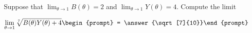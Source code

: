 \documentclass{ximera}
\author{Matthew Carr}
\begin{document}
\begin{exercise}
Suppose that $\lim_{\theta\to1}B(\theta)=2$ and $\lim_{\theta\to1}Y(\theta)=4$. Compute the limit

\[
\lim_{\theta\to 1 } \sqrt[7]{B(\theta)Y(\theta)+4}\begin{prompt} = \answer{\sqrt[7]{10}}\end{prompt}
\]
\end{exercise}
\end{document}
